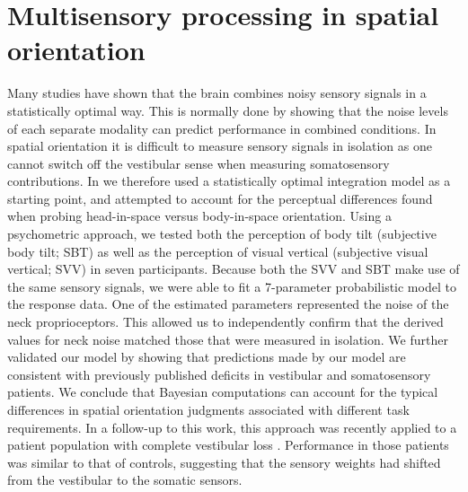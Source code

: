 \section{Multisensory processing in spatial orientation}
Many studies have shown that the brain combines noisy sensory signals in a statistically optimal way. This is normally done by showing that the noise levels of each separate modality can predict performance in combined conditions. In spatial orientation it is difficult to measure sensory signals in isolation as one cannot switch off the vestibular sense when measuring somatosensory contributions. In  we therefore used a statistically optimal integration model as a starting point, and attempted to account for the perceptual differences found when probing head-in-space versus body-in-space orientation. Using a psychometric approach, we tested both the perception of body tilt (subjective body tilt; SBT) as well as the perception of visual vertical (subjective visual vertical; SVV) in seven participants. Because both the SVV and SBT make use of the same sensory signals, we were able to fit a 7-parameter probabilistic model to the response data.  One  of the estimated parameters represented the noise of the neck proprioceptors. This allowed us to independently confirm that the derived values for neck noise matched those that were measured in isolation. We further validated our model by showing that predictions made by our model are consistent with previously published deficits in vestibular and somatosensory patients. We conclude that Bayesian computations can account for the typical differences in spatial orientation judgments associated with different task requirements. In a follow-up to this work, this approach was recently applied to a patient population with complete  vestibular loss \cite{alberts2015}. Performance in those patients was similar to that of controls, suggesting that the sensory weights had shifted from the vestibular to the somatic sensors.

